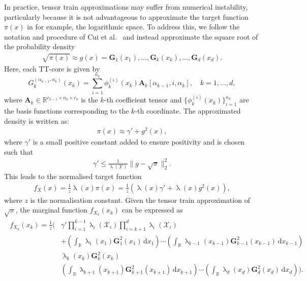 In practice, tensor train approximations may suffer from numerical instability, particularly because it is not advantageous to approximate the target function $\pi(x)$ in for example, the logarithmic space. 
To address this, we follow the notation and procedure of Cui et al.~\cite{cui2022deep} and instead approximate the square root of the probability density
\begin{align}
	\sqrt{\pi(x)} \approx g(x) = \bm{G}_1(x_1), \dots, \bm{G}_k(x_k), \dots, \bm{G}_d(x_d).
\end{align}
Here, each TT-core is given by
\begin{equation}
	G^{(\alpha_{k-1},\alpha_k)}_k(x_k) = \sum_{i=1}^{n_k} \phi^{(i)}_k(x_k) \bm{A}_k[\alpha_{k-1}, i, \alpha_k], \quad k = 1, \dots, d,
\end{equation}
where $\bm{A}_k \in \mathbb{R}^{r_{k-1} \times n_k \times r_k}$ is the $k$-th coefficient tensor and $\{\phi^{(i)}_k(x_k)\}_{i=1}^{n_k}$ are the basis functions corresponding to the $k$-th coordinate.
The approximated density is written as:
\begin{align}
	\pi(x) \approx \gamma' + g^2(x),
\end{align}
where $\gamma'$ is a small positive constant added to ensure positivity and is chosen such that
\begin{align}
	\gamma' \leq \frac{1}{\uplambda(\mathcal{X})} \lVert g - \sqrt{\pi} \rVert_2^2.
\end{align}
This leads to the normalised target function
\begin{align}
	f_X(x) = \frac{1}{z} \uplambda(x) \pi(x)  = \frac{1}{z} \left( \uplambda(x) \gamma'  + \uplambda(x) g^2(x) \right),
\end{align}
where $z$ is the normalisation constant.
Given the tensor train approximation of $\sqrt{\pi}$, the marginal function $f_{X_k}(x_k)$ can be expressed as
\begin{align}
	\begin{split}
		f_{X_k}(x_k) = \frac{1}{z} \Bigg(&\gamma' \prod_{i=1}^{k-1} \uplambda_i(\mathcal{X}_i) \prod_{i=k+1}^{d} \uplambda_i(\mathcal{X}_i) \\
		&+ \left( \int_{\mathbb{R}} \uplambda_1(x_1) \bm{G}_1^2(x_1)  \, \mathrm{d}x_1 \right) \cdots 
		\left( \int_{\mathbb{R}} \uplambda_{k-1}(x_{k-1}) \bm{G}_{k-1}^2(x_{k-1}) \, \mathrm{d}x_{k-1} \right) \\
		& \uplambda_k(x_k) \bm{G}_k^2(x_k)  \\
		&\left( \int_{\mathbb{R}} \uplambda_{k+1}(x_{k+1}) \bm{G}_{k+1}^2(x_{k+1})  \, \mathrm{d}x_{k+1} \right) \cdots 
		\left( \int_{\mathbb{R}} \uplambda_d(x_d) \bm{G}_d^2(x_d)  \, \mathrm{d}x_d \right) \Bigg).
	\end{split}
\end{align}
